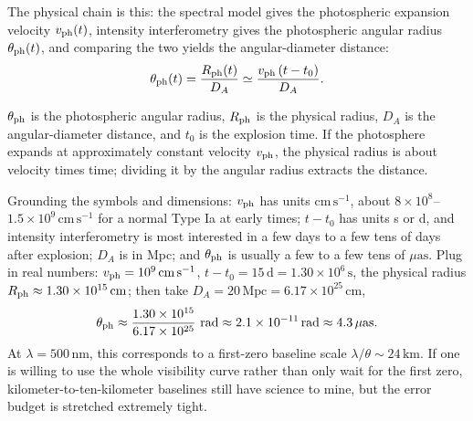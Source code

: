 The physical chain is this: the spectral model gives the photospheric expansion velocity \(v_{\rm ph}(t)\), intensity interferometry gives the photospheric angular radius \(\theta_{\rm ph}(t)\), and comparing the two yields the angular-diameter distance:
\begin{equation}
  \theta_{\rm ph}(t)=\frac{R_{\rm ph}(t)}{D_A}\simeq\frac{v_{\rm ph}\,(t-t_0)}{D_A}.
  \label{eq:e26-typeia-theta}
\end{equation}
\begin{formulaexplain}
\(\theta_{\rm ph}\) is the photospheric angular radius, \(R_{\rm ph}\) is the physical radius, \(D_A\) is the angular-diameter distance, and \(t_0\) is the explosion time. If the photosphere expands at approximately constant velocity \(v_{\rm ph}\), the physical radius is about velocity times time; dividing it by the angular radius extracts the distance.
\end{formulaexplain}
Grounding the symbols and dimensions: \(v_{\rm ph}\) has units \(\mathrm{cm\,s^{-1}}\), about \(8\times10^8\)--\(1.5\times10^9\,\mathrm{cm\,s^{-1}}\) for a normal Type Ia at early times; \(t-t_0\) has units s or d, and intensity interferometry is most interested in a few days to a few tens of days after explosion; \(D_A\) is in Mpc; and \(\theta_{\rm ph}\) is usually a few to a few tens of \(\mu\mathrm{as}\). Plug in real numbers: \(v_{\rm ph}=10^{9}\,\mathrm{cm\,s^{-1}}\), \(t-t_0=15\,\mathrm{d}=1.30\times10^{6}\,\mathrm{s}\), the physical radius \(R_{\rm ph}\approx1.30\times10^{15}\,\mathrm{cm}\); then take \(D_A=20\,\mathrm{Mpc}=6.17\times10^{25}\,\mathrm{cm}\),
\[
  \theta_{\rm ph}\approx\frac{1.30\times10^{15}}{6.17\times10^{25}}\ \mathrm{rad}
  \approx2.1\times10^{-11}\,\mathrm{rad}\approx4.3\,\mu\mathrm{as}.
\]
At \(\lambda=500\,\mathrm{nm}\), this corresponds to a first-zero baseline scale \(\lambda/\theta\sim24\,\mathrm{km}\). If one is willing to use the whole visibility curve rather than only wait for the first zero, kilometer-to-ten-kilometer baselines still have science to mine, but the error budget is stretched extremely tight.

